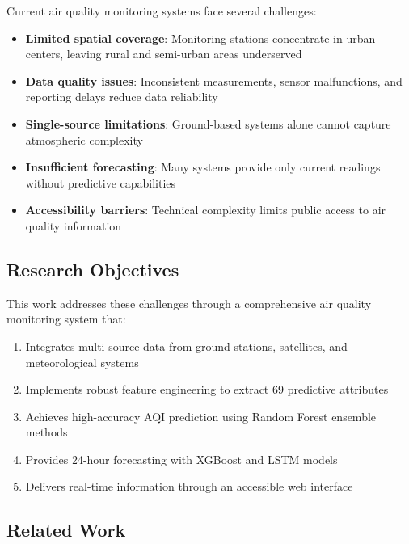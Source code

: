 \documentclass[12pt]{article}
\begin{document}
Current air quality monitoring systems face several challenges:

\begin{itemize}
\item \textbf{Limited spatial coverage}: Monitoring stations concentrate in urban centers, leaving rural and semi-urban areas underserved \citep{gupta2023indian}
\item \textbf{Data quality issues}: Inconsistent measurements, sensor malfunctions, and reporting delays reduce data reliability
\item \textbf{Single-source limitations}: Ground-based systems alone cannot capture atmospheric complexity
\item \textbf{Insufficient forecasting}: Many systems provide only current readings without predictive capabilities
\item \textbf{Accessibility barriers}: Technical complexity limits public access to air quality information
\end{itemize}

\subsection{Research Objectives}

This work addresses these challenges through a comprehensive air quality monitoring system that:

\begin{enumerate}
\item Integrates multi-source data from ground stations, satellites, and meteorological systems
\item Implements robust feature engineering to extract 69 predictive attributes
\item Achieves high-accuracy AQI prediction using Random Forest ensemble methods
\item Provides 24-hour forecasting with XGBoost and LSTM models
\item Delivers real-time information through an accessible web interface
\end{enumerate}

\subsection{Related Work}
\end{document}
